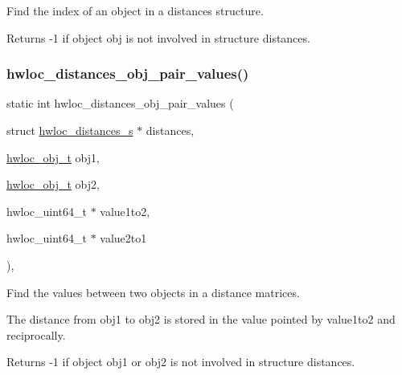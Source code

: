 Find the index of an object in a distances structure. 

\begin{DoxyReturn}{Returns}
-\/1 if object {\ttfamily obj} is not involved in structure {\ttfamily distances}. 
\end{DoxyReturn}
\mbox{\label{a00209_ga3c665b23056e3269f777b21a67148c82}} 
\subsubsection{\texorpdfstring{hwloc\+\_\+distances\+\_\+obj\+\_\+pair\+\_\+values()}{hwloc\_distances\_obj\_pair\_values()}}
{\footnotesize\ttfamily static int hwloc\+\_\+distances\+\_\+obj\+\_\+pair\+\_\+values (\begin{DoxyParamCaption}\item[{struct \hyperlink{a00310}{hwloc\+\_\+distances\+\_\+s} $\ast$}]{distances,  }\item[{\hyperlink{a00185_ga79b8ab56877ef99ac59b833203391c7d}{hwloc\+\_\+obj\+\_\+t}}]{obj1,  }\item[{\hyperlink{a00185_ga79b8ab56877ef99ac59b833203391c7d}{hwloc\+\_\+obj\+\_\+t}}]{obj2,  }\item[{hwloc\+\_\+uint64\+\_\+t $\ast$}]{value1to2,  }\item[{hwloc\+\_\+uint64\+\_\+t $\ast$}]{value2to1 }\end{DoxyParamCaption})\hspace{0.3cm}{\ttfamily [inline]}, {\ttfamily [static]}}



Find the values between two objects in a distance matrices. 

The distance from {\ttfamily obj1} to {\ttfamily obj2} is stored in the value pointed by {\ttfamily value1to2} and reciprocally.

\begin{DoxyReturn}{Returns}
-\/1 if object {\ttfamily obj1} or {\ttfamily obj2} is not involved in structure {\ttfamily distances}. 
\end{DoxyReturn}
